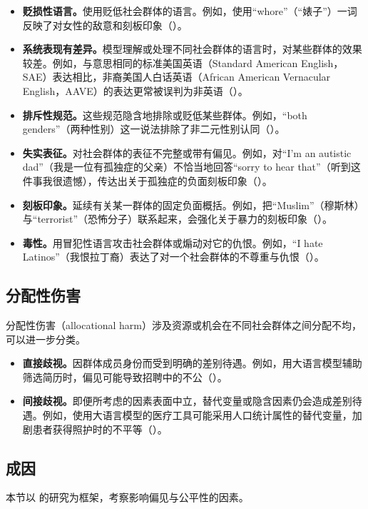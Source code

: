 \begin{itemize}
\item \textbf{贬损性语言。}使用贬低社会群体的语言。例如，使用“whore”（“婊子”）一词反映了对女性的敌意和刻板印象（）。
\item \textbf{系统表现有差异。}模型理解或处理不同社会群体的语言时，对某些群体的效果较差。例如，与意思相同的标准美国英语（Standard American English，SAE）表达相比，非裔美国人白话英语（African American Vernacular English，AAVE）的表达更常被误判为非英语（）。
\item \textbf{排斥性规范。}这些规范隐含地排除或贬低某些群体。例如，“both genders”（两种性别）这一说法排除了非二元性别认同（）。
\item \textbf{失实表征。}对社会群体的表征不完整或带有偏见。例如，对“I'm an autistic dad”（我是一位有孤独症的父亲）不恰当地回答“sorry to hear that”（听到这件事我很遗憾），传达出关于孤独症的负面刻板印象（）。
\item \textbf{刻板印象。}延续有关某一群体的固定负面概括。例如，把“Muslim”（穆斯林）与“terrorist”（恐怖分子）联系起来，会强化关于暴力的刻板印象（）。
\item \textbf{毒性。}用冒犯性语言攻击社会群体或煽动对它的仇恨。例如，“I hate Latinos”（我恨拉丁裔）表达了对一个社会群体的不尊重与仇恨（）。
\end{itemize}

\subsection{分配性伤害}
分配性伤害（allocational harm）涉及资源或机会在不同社会群体之间分配不均，可以进一步分类。

\begin{itemize}
\item \textbf{直接歧视。}因群体成员身份而受到明确的差别待遇。例如，用大语言模型辅助筛选简历时，偏见可能导致招聘中的不公（）。
\item \textbf{间接歧视。}即便所考虑的因素表面中立，替代变量或隐含因素仍会造成差别待遇。例如，使用大语言模型的医疗工具可能采用人口统计属性的替代变量，加剧患者获得照护时的不平等（）。
\end{itemize}

\subsection{成因}
本节以 的研究为框架，考察影响偏见与公平性的因素。

